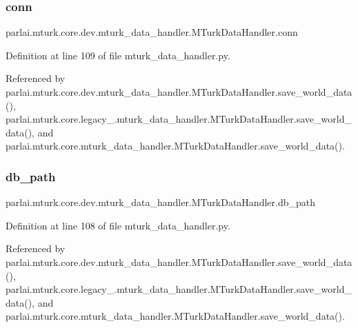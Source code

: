 \subsubsection{\texorpdfstring{conn}{conn}}
{\footnotesize\ttfamily parlai.\+mturk.\+core.\+dev.\+mturk\+\_\+data\+\_\+handler.\+M\+Turk\+Data\+Handler.\+conn}



Definition at line 109 of file mturk\+\_\+data\+\_\+handler.\+py.



Referenced by parlai.\+mturk.\+core.\+dev.\+mturk\+\_\+data\+\_\+handler.\+M\+Turk\+Data\+Handler.\+save\+\_\+world\+\_\+data(), parlai.\+mturk.\+core.\+legacy\+\_.\+mturk\+\_\+data\+\_\+handler.\+M\+Turk\+Data\+Handler.\+save\+\_\+world\+\_\+data(), and parlai.\+mturk.\+core.\+mturk\+\_\+data\+\_\+handler.\+M\+Turk\+Data\+Handler.\+save\+\_\+world\+\_\+data().

\mbox{\label{classparlai_1_1mturk_1_1core_1_1dev_1_1mturk__data__handler_1_1MTurkDataHandler_a7cca153268ab042892a68ad4aa032414}} 
\subsubsection{\texorpdfstring{db\+\_\+path}{db\_path}}
{\footnotesize\ttfamily parlai.\+mturk.\+core.\+dev.\+mturk\+\_\+data\+\_\+handler.\+M\+Turk\+Data\+Handler.\+db\+\_\+path}



Definition at line 108 of file mturk\+\_\+data\+\_\+handler.\+py.



Referenced by parlai.\+mturk.\+core.\+dev.\+mturk\+\_\+data\+\_\+handler.\+M\+Turk\+Data\+Handler.\+save\+\_\+world\+\_\+data(), parlai.\+mturk.\+core.\+legacy\+\_.\+mturk\+\_\+data\+\_\+handler.\+M\+Turk\+Data\+Handler.\+save\+\_\+world\+\_\+data(), and parlai.\+mturk.\+core.\+mturk\+\_\+data\+\_\+handler.\+M\+Turk\+Data\+Handler.\+save\+\_\+world\+\_\+data().


